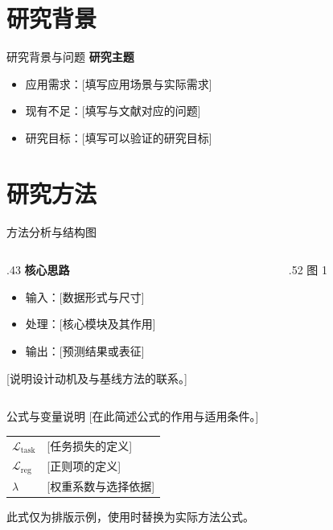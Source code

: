 \documentclass[aspectratio=169,11pt]{beamer}
\begin{document}
\DrawCoverPage
{}

\section{研究背景}
\begin{frame}{研究背景与问题}
  \textbf{研究主题}\par
  [用一至两句话说明研究对象、应用场景与待解决的问题。]
  \vspace{.25cm}
  \begin{itemize}
    \setlength{\itemsep}{.7em}
    \item 应用需求：[填写应用场景与实际需求]
    \item 现有不足：[填写与文献对应的问题]
    \item 研究目标：[填写可以验证的研究目标]
  \end{itemize}
\end{frame}

\section{研究方法}
\begin{frame}{方法分析与结构图}
  \begin{columns}[T,onlytextwidth]
    \begin{column}{.43\textwidth}
      \textbf{核心思路}\par
      \begin{itemize}
        \setlength{\itemsep}{.7em}
        \item 输入：[数据形式与尺寸]
        \item 处理：[核心模块及其作用]
        \item 输出：[预测结果或表征]
      \end{itemize}
      \vspace{.3cm}
      [说明设计动机及与基线方法的联系。]
    \end{column}
    \begin{column}{.52\textwidth}
      {\small\color{muted}图 1\quad [结构图名称与来源]}
    \end{column}
  \end{columns}
\end{frame}

\begin{frame}{公式与变量说明}
  [在此简述公式的作用与适用条件。]
  \begin{tabular}{@{}ll@{}}
    $\mathcal{L}_{\mathrm{task}}$ & [任务损失的定义] \\[.35em]
    $\mathcal{L}_{\mathrm{reg}}$  & [正则项的定义] \\[.35em]
    $\lambda$                  & [权重系数与选择依据]
  \end{tabular}\par
  \vspace{.2cm}
  {\small\color{muted}此式仅为排版示例，使用时替换为实际方法公式。}
\end{frame}
\end{document}
